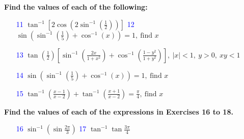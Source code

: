 \documentclass[a4paper,12pt]{article}                                                                       \usepackage{amsmath, amssymb, xcolor, tcolorbox}                                                            \usepackage{geometry}
\begin{document}
\textbf{Find the values of each of the following:}

\begin{enumerate}
    \item[\textcolor{blue}{11}]  $ \tan^{-1}\left[ 2 \cos\left( 2 \sin^{-1}\left( \frac{1}{2} \right) \right) \right] $
    \hspace{1cm}
    \textcolor{blue}{12} $ \sin \left( \sin^{-1}\left( \frac{1}{5} \right) + \cos^{-1}(x) \right) = 1, \ \text{find } x$
\end{enumerate}
                                                                                                

\begin{enumerate}
    \item[\textcolor{blue}{13}] $ \tan\left(\frac{1}{2}\right) \left[ \sin^{-1}\left(\frac{2x}{1+x^2}\right) + \cos^{-1}\left(\frac{1-y^2}{1+y^2}\right) \right] , \ |x| < 1, \ y > 0, \ xy < 1$
    \item[\textcolor{blue}{14}] $ \sin \left( \sin^{-1}\left( \frac{1}{5} \right) + \cos^{-1}(x) \right) = 1, \ \text{find } x$
    \item[\textcolor{blue}{15}] $ \tan^{-1} \left( \frac{x-1}{x-2} \right) + \tan^{-1} \left( \frac{x+1}{x-2} \right) = \frac{\pi}{4}, \ \text{find } x$
\end{enumerate}

\textbf{Find the values of each of the expressions in Exercises 16 to 18.}

\begin{enumerate}
    \item[\textcolor{blue}{16}] $\sin^{-1} \left( \sin \frac{2\pi}{3} \right)$
    \hspace{1cm}
    \textcolor{blue}{17} $\tan^{-1} \tan \frac{3\pi}{4}$
\end{enumerate}
\end{document}
